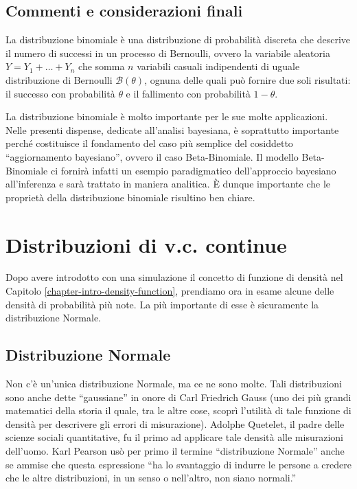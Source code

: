 \documentclass[
  11pt,
]{krantz}
\theoremstyle{definition}
\theoremstyle{definition}
\theoremstyle{definition}
\theoremstyle{definition}
\theoremstyle{remark}
\begin{document}
\hypertarget{commenti-e-considerazioni-finali-4}{%
\section*{Commenti e considerazioni finali}\label{commenti-e-considerazioni-finali-4}}


La distribuzione binomiale è una distribuzione di probabilità discreta che descrive il numero di successi in un processo di Bernoulli, ovvero la variabile aleatoria \(Y = Y_1 + \dots + Y_n\) che somma \(n\) variabili casuali indipendenti di uguale distribuzione di Bernoulli \(\mathcal{B}(\theta)\), ognuna delle quali può fornire due soli risultati: il successo con probabilità \(\theta\) e il fallimento con probabilità \(1 - \theta\).

La distribuzione binomiale è molto importante per le sue molte applicazioni. Nelle presenti dispense, dedicate all'analisi bayesiana, è soprattutto importante perché costituisce il fondamento del caso più semplice del cosiddetto ``aggiornamento bayesiano'', ovvero il caso Beta-Binomiale. Il modello Beta-Binomiale ci fornirà infatti un esempio paradigmatico dell'approccio bayesiano all'inferenza e sarà trattato in maniera analitica. È dunque importante che le proprietà della distribuzione binomiale risultino ben chiare.

\hypertarget{distr-rv-cont}{%
\chapter{Distribuzioni di v.c. continue}\label{distr-rv-cont}}

Dopo avere introdotto con una simulazione il concetto di funzione di densità nel Capitolo \ref{chapter-intro-density-function}, prendiamo ora in esame alcune delle densità di probabilità più note. La più importante di esse è sicuramente la distribuzione Normale.

\hypertarget{distribuzione-normale}{%
\section{Distribuzione Normale}\label{distribuzione-normale}}

Non c'è un'unica distribuzione Normale, ma ce ne sono molte. Tali distribuzioni sono anche dette ``gaussiane'' in onore di Carl Friedrich Gauss (uno dei più grandi matematici della storia il quale, tra le altre cose, scoprì l'utilità di tale funzione di densità per descrivere gli errori di misurazione). Adolphe Quetelet, il padre delle scienze sociali quantitative, fu il primo ad applicare tale densità alle misurazioni dell'uomo. Karl Pearson usò per primo il termine ``distribuzione Normale'' anche se ammise che questa espressione ``ha lo svantaggio di indurre le persone a credere che le altre distribuzioni, in un senso o nell'altro, non siano normali.''
\end{document}
